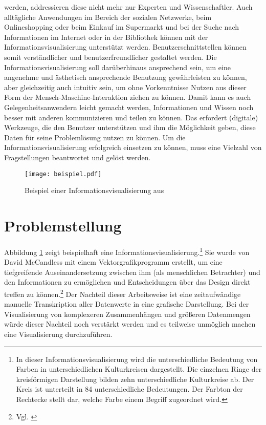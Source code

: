 \documentclass[a4paper, 12pt, DIVcalc, onepage, pdftex, headsepline, footsepline]{scrreprt}
\begin{document}
werden, addressieren diese nicht mehr nur Experten und Wissenschaftler. Auch alltägliche Anwendungen
im Bereich der sozialen Netzwerke, beim Onlineshopping oder beim Einkauf im Supermarkt und bei der Suche nach Informationen
im Internet oder in der Bibliothek können mit der Informationsvisualisierung unterstützt
werden. Benutzerschnittstellen können somit verständlicher und benutzerfreundlicher gestaltet werden.
Die Informationsvisualisierung soll darüberhinaus ansprechend sein, um eine angenehme und ästhetisch ansprechende Benutzung
gewährleisten zu können, aber gleichzeitig auch intuitiv sein, um ohne Vorkenntnisse Nutzen aus
dieser Form der Mensch-Maschine-Interaktion ziehen zu können. Damit kann es auch Gelegenheitsanwendern
leicht gemacht werden, Informationen und
Wissen noch besser mit anderen kommunizieren und teilen zu können. Das erfordert (digitale) Werkzeuge,
die den Benutzer unterstützen und ihm die Möglichkeit geben, diese Daten für seine Problemlösung nutzen zu können.
Um die Informationsvisualisierung erfolgreich einsetzen zu können, muss eine Vielzahl von Fragstellungen
beantwortet und gelöst werden.
\begin{figure}
\centering
\texttt{[image: beispiel.pdf]}
\caption{Beispiel einer Informationsvisualisierung aus \citep[S.\,76]{McCandless}}
\label{fig:beispiel}
\end{figure}
\section{Problemstellung}
Abbildung \ref{fig:beispiel} zeigt beispielhaft eine Informationsvisualisierung.\footnote{In dieser
Informationsvisualisierung wird die unterschiedliche Bedeutung von Farben in unterschiedlichen
Kulturkreisen dargestellt. Die einzelnen Ringe der kreisförmigen Darstellung bilden zehn
unterschiedliche Kulturkreise ab. Der Kreis ist unterteilt in 84 unterschiedliche Bedeutungen.
Der Farbton der Rechtecke stellt dar, welche Farbe einem Begriff zugeordnet wird.}
Sie wurde von David McCandless mit einem Vektorgrafikprogramm erstellt, um
eine tiefgreifende Auseinandersetzung zwischen ihm (als menschlichen Betrachter) und den Informationen
zu ermöglichen und Entscheidungen über das Design direkt treffen zu können.\footnote{Vgl. \citep{infoblog}} Der Nachteil dieser
Arbeitsweise ist eine zeitaufwändige manuelle Transkription aller Datenwerte in eine grafische
Darstellung. Bei der Visualisierung von komplexeren Zusammenhängen und größeren Datenmengen würde dieser 
Nachteil noch verstärkt werden und es teilweise unmöglich machen eine Visualisierung durchzuführen.
\end{document}

